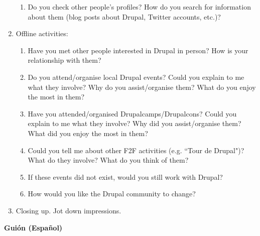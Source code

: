 \begin{enumerate}
\begin{enumerate}
			\item Do you check other people's profiles? How do you search for information about them (blog posts about Drupal, Twitter accounts, etc.)?
		\end{enumerate}
	\item Offline activities:
		\begin{enumerate}
			\item Have you met other people interested in Drupal in person? How is your relationship with them?
			\item Do you attend\slash organise local Drupal events? Could you explain to me what they involve? Why do you assist\slash organise them? What do you enjoy the most in them?
			\item Have you attended\slash organised Drupalcamps\slash Drupalcons? Could you explain to me what they involve?  Why did you assist\slash organise them? What did you enjoy the most in them?
			\item Could you tell me about other F2F activities (e.g. ``Tour de Drupal")? What do they involve? What do you think of them?
			\item If these events did not exist, would you still work with Drupal?
			\item How would you like the Drupal community to change?
		\end{enumerate}
	\item Closing up. Jot down impressions.
\end{enumerate}

\newpage

\hrulefill\par

\begin{center}
\textbf{Guión (Español)}
\end{center}

